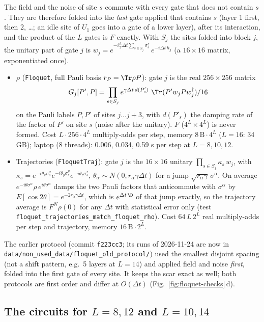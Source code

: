 The field and the noise of site $s$ commute with every gate that does not contain $s$. They are therefore folded into the \emph{last} gate applied that contains $s$ (layer 1 first, then 2, \dots; an idle site of $U_1$ goes into a gate of a lower layer), after its interaction, and the product of the $L$ gates is $F$ exactly. With $S_j$ the sites folded into block $j$, the unitary part of gate $j$ is $w_j = e^{-i\frac h2\Delta t\sum_{s\in S_j}\sigma^z_s}\,e^{-i\Delta t\, h_j}$ (a $16\times16$ matrix, exponentiated once).
\begin{itemize}
\item $\rho$ (\texttt{Floquet}, full Pauli basis $r_P = \Tr\rho P$): gate $j$ is the real $256\times256$ matrix
\[
G_j[P', P] = \prod_{s\in S_j} e^{\gamma\Delta t\, d(P'_s)}\ \Tr(P' w_j P w_j^\dagger)/16
\]
on the Pauli labels $P, P'$ of sites $j \dots j+3$, with $d(P'_s)$ the damping rate of the factor of $P'$ on site $s$ (noise after the unitary). $F$ ($4^L\times 4^L$) is never formed. Cost $L\cdot256\cdot4^L$ multiply-adds per step, memory $8\,\mathrm B\cdot4^L$ ($L = 16$: 34 GB); laptop (8 threads): 0.006, 0.034, 0.59 s per step at $L = 8, 10, 12$.
\item Trajectories (\texttt{FloquetTraj}): gate $j$ is the $16\times16$ unitary $\prod_{s\in S_j}\kappa_s\, w_j$, with $\kappa_s = e^{-i\theta_x\sigma^x_s}e^{-i\theta_y\sigma^y_s}e^{-i\theta_z\sigma^z_s}$, $\theta_\alpha \sim N(0, r_\alpha\gamma\Delta t)$ for a jump $\sqrt{r_\alpha\gamma}\,\sigma^\alpha$. On average $e^{-i\theta\sigma^\alpha}\rho\, e^{i\theta\sigma^\alpha}$ damps the two Pauli factors that anticommute with $\sigma^\alpha$ by $E[\cos2\theta] = e^{-2r_\alpha\gamma\Delta t}$, which is $e^{\Delta t\,\D}$ of that jump exactly, so the trajectory average is $F^N\rho(0)$ for any $\Delta t$ with statistical error only (test \texttt{floquet\_trajectories\_match\_floquet\_rho}). Cost $64\,L\,2^L$ real multiply-adds per step and trajectory, memory $16\,\mathrm B\cdot 2^L$.
\end{itemize}
The earlier protocol (commit \texttt{f223cc3}; its runs of 2026-11-24 are now in \texttt{data/non\_used\_data/}\allowbreak\texttt{floquet\_old\_protocol/}) used the smallest disjoint spacing (not a shift pattern, e.g.\ 5 layers at $L = 14$) and applied field and noise \emph{first}, folded into the first gate of every site. It keeps the scar exact as well; both protocols are first order and differ at $O(\Delta t)$ (Fig.~\ref{fig:floquet-checks}\,d).

\subsection{The circuits for $L = 8, 12$ and $L = 10, 14$}
\label{sec:floquet-circuits}

